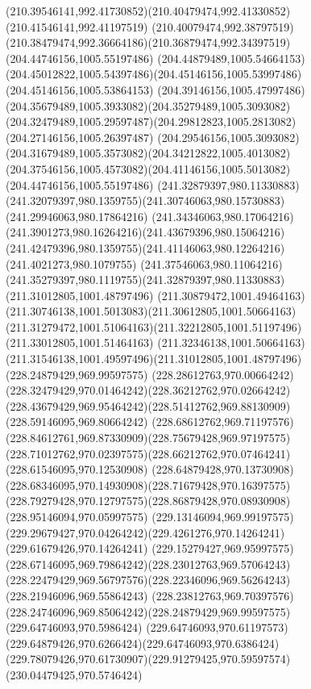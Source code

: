 {{		\curveto(210.39546141,992.41730852)(210.40479474,992.41330852)(210.41546141,992.41197519)
		\curveto(210.40079474,992.38797519)(210.38479474,992.36664186)(210.36879474,992.34397519)
		\moveto(204.44746156,1005.55197486)
		\curveto(204.44879489,1005.54664153)(204.45012822,1005.54397486)(204.45146156,1005.53997486)
		\lineto(204.45146156,1005.53864153)
		\curveto(204.39146156,1005.47997486)(204.35679489,1005.3933082)(204.35279489,1005.3093082)
		\curveto(204.32479489,1005.29597487)(204.29812823,1005.2813082)(204.27146156,1005.26397487)
		\curveto(204.29546156,1005.3093082)(204.31679489,1005.3573082)(204.34212822,1005.4013082)
		\curveto(204.37546156,1005.4573082)(204.41146156,1005.5013082)(204.44746156,1005.55197486)
		\moveto(241.32879397,980.11330883)
		\curveto(241.32079397,980.1359755)(241.30746063,980.15730883)(241.29946063,980.17864216)
		\curveto(241.34346063,980.17064216)(241.3901273,980.16264216)(241.43679396,980.15064216)
		\curveto(241.42479396,980.1359755)(241.41146063,980.12264216)(241.4021273,980.1079755)
		\curveto(241.37546063,980.11064216)(241.35279397,980.1119755)(241.32879397,980.11330883)
		\moveto(211.31012805,1001.48797496)
		\curveto(211.30879472,1001.49464163)(211.30746138,1001.5013083)(211.30612805,1001.50664163)
		\curveto(211.31279472,1001.51064163)(211.32212805,1001.51197496)(211.33012805,1001.51464163)
		\curveto(211.32346138,1001.50664163)(211.31546138,1001.49597496)(211.31012805,1001.48797496)
		\moveto(228.24879429,969.99597575)
		\curveto(228.28612763,970.00664242)(228.32479429,970.01464242)(228.36212762,970.02664242)
		\curveto(228.43679429,969.95464242)(228.51412762,969.88130909)(228.59146095,969.80664242)
		\curveto(228.68612762,969.71197576)(228.84612761,969.87330909)(228.75679428,969.97197575)
		\curveto(228.71012762,970.02397575)(228.66212762,970.07464241)(228.61546095,970.12530908)
		\curveto(228.64879428,970.13730908)(228.68346095,970.14930908)(228.71679428,970.16397575)
		\curveto(228.79279428,970.12797575)(228.86879428,970.08930908)(228.95146094,970.05997575)
		\curveto(229.13146094,969.99197575)(229.29679427,970.04264242)(229.4261276,970.14264241)
		\lineto(229.61679426,970.14264241)
		\curveto(229.15279427,969.95997575)(228.67146095,969.79864242)(228.23012763,969.57064243)
		\curveto(228.22479429,969.56797576)(228.22346096,969.56264243)(228.21946096,969.55864243)
		\curveto(228.23812763,969.70397576)(228.24746096,969.85064242)(228.24879429,969.99597575)
		\moveto(229.64746093,970.5986424)
		\curveto(229.64746093,970.61197573)(229.64879426,970.6266424)(229.64746093,970.6386424)
		\curveto(229.78079426,970.61730907)(229.91279425,970.59597574)(230.04479425,970.5746424)
}}
